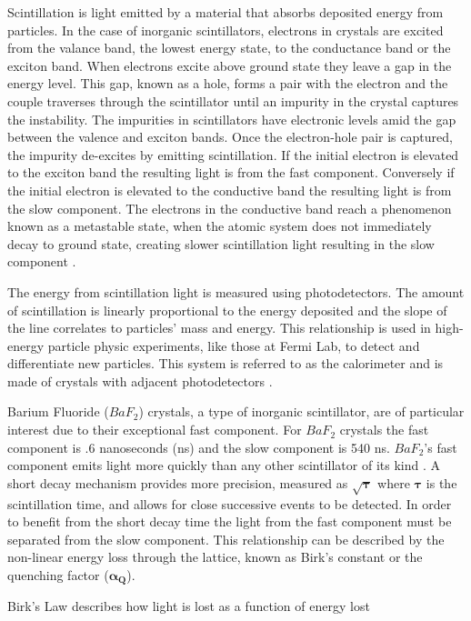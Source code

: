 \documentclass[aip, jmp, amssymb, amsmath, reprint, floatfix]{revtex4-1}
\begin{document}
Scintillation is light emitted by a material that absorbs deposited energy from particles. In the case of inorganic scintillators, electrons in crystals are excited from the valance band, the lowest energy state, to the conductance band or the exciton band. When electrons excite above ground state they leave a gap in the energy level. This gap, known as a hole, forms a pair with the electron and the couple traverses through the scintillator until an impurity in the crystal captures the instability. The impurities in scintillators have electronic levels amid the gap between the valence and exciton bands. Once the electron-hole pair is captured, the impurity de-excites by emitting scintillation. If the initial electron is elevated to the exciton band the resulting light is from the fast component. Conversely if the initial electron is elevated to the conductive band the resulting light is from the slow component. The electrons in the conductive band reach a phenomenon known as a metastable state, when the atomic system does not immediately decay to ground state, creating slower scintillation light resulting in the slow component \cite{scint}. 

The energy from scintillation light is measured using photodetectors. The amount of scintillation is linearly proportional to the energy deposited and the slope of the line correlates to particles' mass and energy. This relationship is used in high-energy particle physic experiments, like those at Fermi Lab, to detect and differentiate new particles. This system is referred to as the calorimeter and is made of crystals with adjacent photodetectors \cite{Mu2e}. 

Barium Fluoride ($BaF_2$) crystals, a type of inorganic scintillator, are of particular interest due to their exceptional fast component. For $BaF_2$ crystals the fast component is .6 nanoseconds (ns) and the slow component is 540 ns. $BaF_2$'s fast component emits light more quickly than any other scintillator of its kind \cite{BaF2specs}. A short decay mechanism provides more precision, measured as $\bm{\sqrt{\tau}}$ where $\bm{\tau}$ is the scintillation time, and allows for close successive events to be detected. In order to benefit from the short decay time the light from the fast component must be separated from the slow component. This relationship can be described by the non-linear energy loss through the lattice, known as Birk's constant or the quenching factor ($\bm{\alpha_Q}$). 

Birk's Law describes how light is lost as a function of energy lost  
\end{document}
